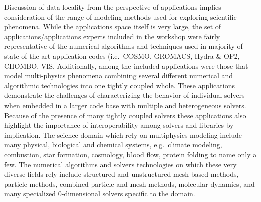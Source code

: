 %
%
$ $\\
\noindent
Discussion of data locality from the perspective of applications implies
consideration of the range of modeling methods used for exploring
scientific phenomena. While the  
applications space itself is very large, the set of
applications/applications experts included in the workshop were fairly 
representative of the numerical algorithms and techniques used in
majority of state-of-the-art application codes (i.e.\ COSMO\cite{cosmo},
GROMACS\cite{gromacs4,gromacs4.5,gromacs-exascale}, Hydra \& OP2\cite{Hydra, op2}, CHOMBO\cite{chombo}, VIS\cite{vis}.
Additionally, among the included applications were those that model
multi-physics phenomena combining several different numerical and
algorithmic technologies into one tightly coupled whole. These
applications demonstrate the challenges of characterizing the behavior
of individual solvers when embedded in a larger code base with
multiple and heterogeneous solvers.  Because of the presence of many
tightly coupled solvers these applications also
highlight the importance of interoperability among solvers and
libraries by implication. The science domain which rely on multiphysics modeling
include many physical, biological and chemical systems, e.g.\ climate
modeling, combustion, star formation, cosmology, blood flow, protein
folding to name only a few. The numerical algorithms and solvers
technologies on which these very diverse fields rely include
structured and unstructured mesh based methods, particle methods,
combined particle and mesh methods, molecular dynamics,  and many
specialized 0-dimensional solvers specific to the domain. 

